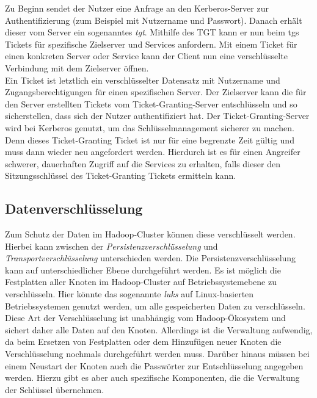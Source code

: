 \noindent
Zu Beginn sendet der Nutzer eine Anfrage an den Kerberos-Server zur Authentifizierung (zum Beispiel mit Nutzername und Passwort). Danach erhält dieser vom Server ein sogenanntes \textit{\gls{tgt}}. Mithilfe des TGT kann er nun beim \gls{tgs} Tickets für spezifische Zielserver und Services anfordern. Mit einem Ticket für einen konkreten Server oder Service kann der Client nun eine verschlüsselte Verbindung mit dem Zielserver öffnen.\\
Ein Ticket ist letztlich ein verschlüsselter Datensatz mit Nutzername und Zugangsberechtigungen für einen spezifischen Server. Der Zielserver kann die für den Server erstellten Tickets vom Ticket-Granting-Server entschlüsseln und so sicherstellen, dass sich der Nutzer authentifiziert hat. Der Ticket-Granting-Server wird bei Kerberos genutzt, um das Schlüsselmanagement sicherer zu machen. Denn dieses Ticket-Granting Ticket ist nur für eine begrenzte Zeit gültig und muss dann wieder neu angefordert werden. Hierdurch ist es für einen Angreifer schwerer, dauerhaften Zugriff auf die Services zu erhalten, falls dieser den Sitzungsschlüssel des Ticket-Granting Tickets ermitteln kann.\cite[S. 425-429]{crypto}\\


\subsection{Datenverschlüsselung}
Zum Schutz der Daten im Hadoop-Cluster können diese verschlüsselt werden. Hierbei kann zwischen der \textit{Persistenzverschlüsselung} und \textit{Transportverschlüsselung} unterschieden werden. Die Persistenzverschlüsselung kann auf unterschiedlicher Ebene durchgeführt werden. 
Es ist möglich die Festplatten aller Knoten im Hadoop-Cluster auf Betriebssystemebene zu verschlüsseln. Hier könnte das sogenannte \textit{\gls{luks}} auf Linux-basierten Betriebssystemen genutzt werden, um alle gespeicherten Daten zu verschlüsseln. Diese Art der Verschlüsselung ist unabhängig vom Hadoop-Ökosystem und sichert daher alle Daten auf den Knoten. Allerdings ist die Verwaltung aufwendig, da beim Ersetzen von Festplatten oder dem Hinzufügen neuer Knoten die Verschlüsselung nochmals durchgeführt werden muss. Darüber hinaus müssen bei einem Neustart der Knoten auch die Passwörter zur Entschlüsselung angegeben werden. Hierzu gibt es aber auch spezifische Komponenten, die die Verwaltung der Schlüssel übernehmen. \cite[S. 202-204]{hadoop_security}\\

